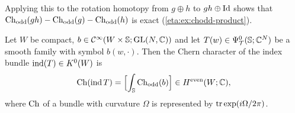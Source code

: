 Applying this to the rotation homotopy from $g\oplus h$ to $gh\oplus\operatorname{Id}$ shows that
$\operatorname{Ch}_{\mathrm{odd}}(gh)-\operatorname{Ch}_{\mathrm{odd}}(g)-\operatorname{Ch}_{\mathrm{odd}}(h)$ is exact (\cref{eta:ex:chodd-product}).

\begin{proposition}\label{eta:prop:toeplitz-chern}
Let $W$ be compact, $b\in\mathcal{C}^\infty(W\times\mathbb{S};\operatorname{GL}(N,\mathbb{C}))$ and let $T(w)\in\Psi^{0}_{\mathcal{T}}(\mathbb{S};\mathbb{C}^N)$
be a smooth family with symbol $b(w,\cdot)$. Then the Chern character of the index
bundle $\operatorname{ind}(T)\in K^0(W)$ is
\begin{equation}\label{eta:eq:toeplitz-chern}
\operatorname{Ch}(\operatorname{ind} T)=\Bigl[\int_{\mathbb{S}}\operatorname{Ch}_{\mathrm{odd}}(b)\Bigr]\in H^{\mathrm{even}}(W;\mathbb{C}),
\end{equation}
where $\operatorname{Ch}$ of a bundle with curvature $\Omega$ is represented by $\operatorname{tr}\exp(i\Omega/2\pi)$.
\end{proposition}

